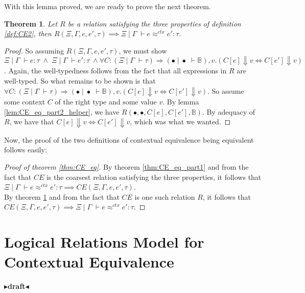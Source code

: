 \documentclass[twoside,11pt,openright]{report}
\newtheorem{theorem}{Theorem}
\theoremstyle{definition}
\newcommand{\expr}{e}
\newcommand{\val}{v}
\newcommand{\ctx}{C}
\newcommand{\Tbool}{\mathbb{B}}
\newcommand{\typ}{\tau}
\newcommand{\venv}{\Gamma}
\newcommand{\tenv}{\Xi}
\newcommand{\emptenv}{\bullet}
\newcommand{\empvenv}{\bullet}
\newcommand{\jdg}[4]{#1 \; | \; #2 \; \vdash #3 : #4}
\newcommand{\jdgType}[3]{#1 \; | \; #2 \; \vdash #3}
\newcommand{\jdgRel}[6]{#1 \; | \; #2 \; \vdash #3 \approx^{#4} #5 : #6}
\newcommand{\ctxRel}[5]{\jdgRel{#1}{#2}{#3}{ctx}{#4}{#5}}
\newcommand{\todo}[1]{{\color[rgb]{.5,0,0}\textbf{$\blacktriangleright$#1$\blacktriangleleft$}}}
\begin{document}
With this lemma proved, we are ready to prove the next theorem.
\begin{theorem}\label{thm:CE_eq_part2}
  Let $R$ be a relation satisfying the three properties of definition \ref{def:CE2}, then $R(\tenv, \venv, \expr, \expr', \typ) \implies \ctxRel{\tenv}{\venv}{\expr}{\expr'}{\typ}$.
\end{theorem}
\begin{proof}
  So assuming $R(\tenv, \venv, \expr, \expr', \typ)$, we must show 
  $\jdg{\tenv}{\venv}{\expr}{\typ} \; \land \; \jdg{\tenv}{\venv}{\expr'}{\typ} \; \land \forall \ctx : (\jdgType{\tenv}{\venv}{\typ}) \Rightarrow (\jdgType{\emptenv}{\empvenv}{\Tbool}), \val . (\ctx[\expr] \Downarrow \val \iff \ctx[\expr'] \Downarrow \val)$. Again, the well-typedness follows from the fact that all expressions in $R$ are well-typed. So what remains to be shown is that $\forall \ctx : (\jdgType{\tenv}{\venv}{\typ}) \Rightarrow (\jdgType{\emptenv}{\empvenv}{\Tbool}), \val . (\ctx[\expr] \Downarrow \val \iff \ctx[\expr'] \Downarrow \val)$. So assume some context $C$ of the right type and some value $\val$. By lemma \ref{lem:CE_eq_part2_helper}, we have $R(\emptenv, \empvenv, C[\expr], C[\expr'], \Tbool)$. By adequacy of $R$, we have that $\ctx[\expr] \Downarrow \val \iff \ctx[\expr'] \Downarrow \val$, which was what we wanted.
\end{proof}

Now, the proof of the two definitions of contextual equivalence being equivalent follows easily:
\begin{proof}[Proof of theorem \ref{thm:CE_eq}]
  By theorem \ref{thm:CE_eq_part1} and from the fact that $CE$ is the coarsest relation satisfying the three properties, it follows that $\ctxRel{\tenv}{\venv}{\expr}{\expr'}{\typ} \implies CE(\tenv, \venv, \expr, \expr', \typ)$.\\
  By theorem \ref{thm:CE_eq_part2} and from the fact that $CE$ is one such relation $R$, it follows that $CE(\tenv, \venv, \expr, \expr', \typ) \implies \ctxRel{\tenv}{\venv}{\expr}{\expr'}{\typ}$.
\end{proof}


\chapter{Logical Relations Model for Contextual Equivalence}
\label{ch:LR}

\todo{draft}
\end{document}
